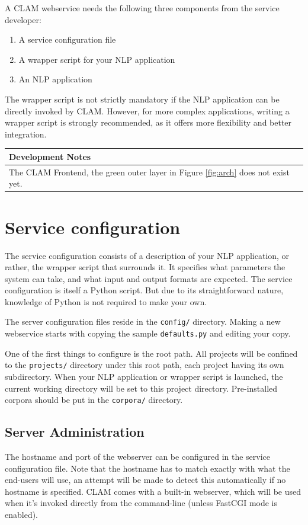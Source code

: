 \documentclass[a4paper,12pt]{report}
\newenvironment{devnotes}
{\newpage
\begin{center}
    \begin{tabular}[h!]{|p{0.8\textwidth}|}
    \hline
    {\bf Development Notes}\\\hline}
{   \\\hline
    \end{tabular}
\end{center}}
\begin{document}
A CLAM webservice needs the following three components from the service developer:

\begin{enumerate}
\item A service configuration file
\item A wrapper script for your NLP application
\item An NLP application
\end{enumerate}

The wrapper script is not strictly mandatory if the NLP application can be directly invoked by CLAM. However, for more complex applications, writing a wrapper script is strongly recommended, as it offers more flexibility and better integration.

\begin{devnotes}
The CLAM Frontend, the green outer layer in Figure \ref{fig:arch} does not exist yet.
\end{devnotes}


\section{Service configuration}
\label{sec:serviceconfig}

The service configuration consists of a description of your NLP application, or rather, the wrapper script that surrounds it. It specifies what parameters the system can take, and what input and output formats are expected. The service configuration is itself a Python script. But due to its straightforward nature, knowledge of Python is not required to make your own.

The server configuration files reside in the \texttt{config/} directory. Making a new webservice starts with copying the sample \texttt{defaults.py} and editing your copy.

One of the first things to configure is the root path. All projects will be confined to the \texttt{projects/} directory under this root path, each project having its own subdirectory. When your NLP application or wrapper script is launched, the current working directory will be set to this project directory. Pre-installed corpora should be put in the \texttt{corpora/} directory. 


\subsection{Server Administration}
\label{sec:sadmin}

The hostname and port of the webserver can be configured in the service configuration file. Note that the hostname has to match exactly with what the end-users will use, an attempt will be made to detect this automatically if no hostname is specified. CLAM comes with a built-in webserver, which will be used when it's invoked directly from the command-line (unless FastCGI mode is enabled).
\end{document}
